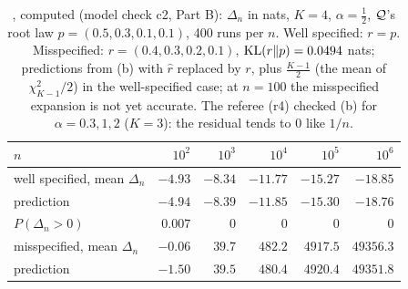 \begin{table}[ht]
\centering\small
\begin{tabular}{@{}lrrrrr@{}}
\toprule
$n$ & $10^2$ & $10^3$ & $10^4$ & $10^5$ & $10^6$\\
\midrule
well specified, mean $\Delta_n$ & $-4.93$ & $-8.34$ & $-11.77$ & $-15.27$ & $-18.85$\\
\quad prediction & $-4.94$ & $-8.39$ & $-11.85$ & $-15.30$ & $-18.76$\\
\quad $P(\Delta_n>0)$ & $0.007$ & $0$ & $0$ & $0$ & $0$\\
misspecified, mean $\Delta_n$ & $-0.06$ & $39.7$ & $482.2$ & $4917.5$ & $49356.3$\\
\quad prediction & $-1.50$ & $39.5$ & $480.4$ & $4920.4$ & $49351.8$\\
\bottomrule
\end{tabular}
\caption{, computed (model check c2, Part B): $\Delta_n$ in nats, $K=4$, $\alpha=\frac12$, $\mathcal{Q}$'s root law $p=(0.5,0.3,0.1,0.1)$, 400 runs per $n$. Well specified: $r=p$. Misspecified: $r=(0.4,0.3,0.2,0.1)$, $\mathrm{KL}(r\|p)=0.0494$ nats; predictions from (b) with $\hat r$ replaced by $r$, plus $\frac{K-1}2$ (the mean of $\chi^2_{K-1}/2$) in the well-specified case; at $n=100$ the misspecified expansion is not yet accurate. The referee (r4) checked (b) for $\alpha=0.3,1,2$ ($K=3$): the residual tends to $0$ like $1/n$.}
\label{tab:ident:c2}
\end{table}

